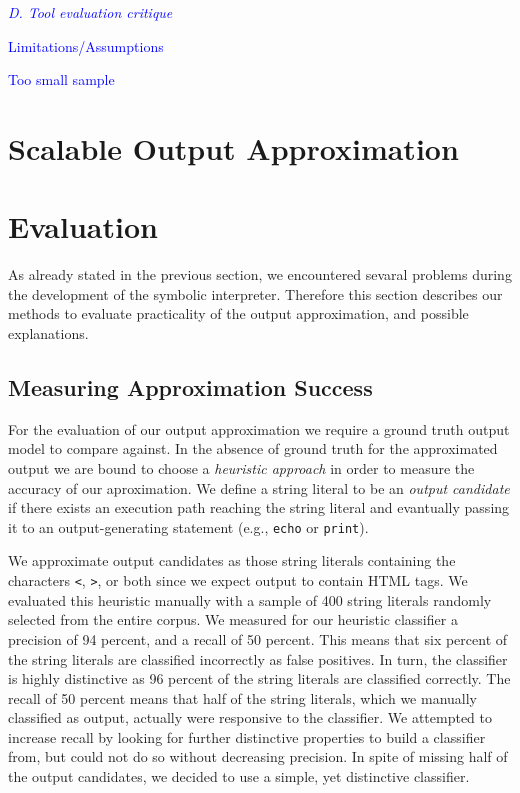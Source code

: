 \documentclass[preprint]{sig-alternate-05-2015}
\begin{document}
\textcolor{blue}{\emph{D. Tool evaluation critique}
\begin{compactitem}
	\item Limitations/Assumptions
	\item Too small sample
\end{compactitem}
}

\section{Scalable Output Approximation}%


\section{Evaluation}
As already stated in the previous section, we encountered sevaral problems
during the development of the symbolic interpreter. Therefore this section
describes our methods to evaluate practicality of the output approximation, and
possible explanations.

\subsection{Measuring Approximation Success} \label{heuristic}
For the evaluation of our output approximation we require a ground truth output model to compare against.
In the absence of ground truth for the approximated output we are bound to choose a \emph{heuristic approach} in order to measure the accuracy of our aproximation. We define a string literal to be an \emph{output candidate} if there exists an execution path reaching the string literal and evantually passing it to an 
output-generating statement (e.g., \texttt{echo} or \texttt{print}).

We approximate output candidates as those string literals containing the characters \texttt{<}, \texttt{>}, or both since we expect output to contain HTML tags. We evaluated this heuristic manually
with a sample of 400 string literals randomly selected from the entire corpus.
We measured for our heuristic classifier a precision of 94 percent, and a recall
of 50 percent. This means that six percent of the string literals are classified incorrectly as false positives. In turn, the classifier is highly distinctive as 96 percent of the string literals are classified correctly. The recall of 50 percent means that half of the string literals, which we manually classified as output, actually were responsive to the classifier. We attempted to increase recall by looking for further distinctive properties to build a classifier from, but could not do so without decreasing precision. In spite of missing half of the output candidates, we decided to use a simple, yet distinctive classifier.
\end{document}
